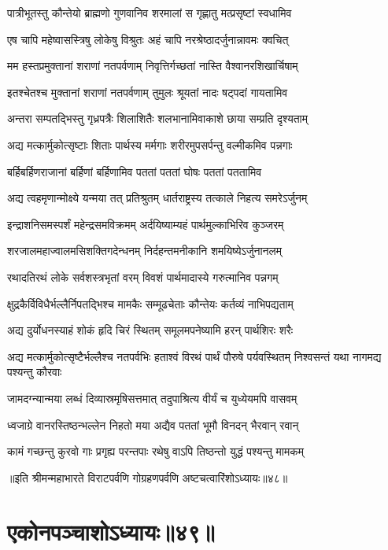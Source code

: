 \twolineshloka
{पात्रीभूतस्तु कौन्तेयो ब्राह्मणो गुणवानिव}
{शरमालां स गृह्णातु मत्प्रसृष्टां स्वधामिव}


\twolineshloka
{एष चापि महेष्वासस्त्रिषु लोकेषु विश्रुतः}
{अहं चापि नरश्रेष्ठादर्जुनान्नावमः क्वचित्}


\twolineshloka
{मम हस्तप्रमुक्तानां शराणां नतपर्वणाम्}
{निवृत्तिर्गच्छतां नास्ति वैश्वानरशिखार्चिषाम्}


\twolineshloka
{इतश्चेतश्च मुक्तानां शराणां नतपर्वणाम्}
{तुमुलः श्रूयतां नादः षट्पदां गायतामिव}


\twolineshloka
{अन्तरा सम्पतद्भिस्तु गृध्रपत्रैः शिलाशितैः}
{शलभानामिवाकाशे छाया सम्प्रति दृश्यताम्}


\twolineshloka
{अद्य मत्कार्मुकोत्सृष्टाः शिताः पार्थस्य मर्मगाः}
{शरीरमुपसर्पन्तु वल्मीकमिव पन्नगाः}


\twolineshloka
{बर्हिबर्हिणराजानां बर्हिणां बर्हिणामिव}
{पततां पततां घोषः पततां पततामिव}


\twolineshloka
{अद्य त्वहमृणान्मोक्ष्ये यन्मया तत् प्रतिश्रुतम्}
{धार्तराष्ट्रस्य तत्काले निहत्य समरेऽर्जुनम्}


\twolineshloka
{इन्द्राशनिसमस्पर्शं महेन्द्रसमविक्रमम्}
{अर्दयिष्याम्यहं पार्थमुल्काभिरिव कुञ्जरम्}


\twolineshloka
{शरजालमहाज्वालमसिशक्तिगदेन्धनम्}
{निर्दहन्तमनीकानि शमयिष्येऽर्जुनानलम्}


\twolineshloka
{रथादतिरथं लोके सर्वशस्त्रभृतां वरम्}
{विवशं पार्थमादास्ये गरुत्मानिव पन्नगम्}


\twolineshloka
{क्षुद्रकैर्विविधैर्भल्लैर्निपतद्भिश्च मामकैः}
{सम्मूढचेताः कौन्तेयः कर्तव्यं नाभिपद्यताम्}


\twolineshloka
{अद्य दुर्योधनस्याहं शोकं हृदि चिरं स्थितम्}
{समूलमपनेष्यामि हरन् पार्थशिरः शरैः}


\threelineshloka
{अद्य मत्कार्मुकोत्सृष्टैर्भल्लैश्च नतपर्वभिः}
{हताश्वं विरथं पार्थं पौरुषे पर्यवस्थितम्}
{निश्वसन्तं यथा नागमद्य पश्यन्तु कौरवाः}


\twolineshloka
{जामदग्न्यान्मया लब्धं दिव्यास्रमृषिसत्तमात्}
{तदुपाश्रित्य वीर्यं च युध्येयमपि वासवम्}


\twolineshloka
{ध्वजाग्रे वानरस्तिष्ठन्भल्लेन निहतो मया}
{अद्यैव पततां भूमौ विनदन् भैरवान् रवान्}


\twolineshloka
{कामं गच्छन्तु कुरवो गाः प्रगृह्य परन्तपाः}
{रथेषु वाऽपि तिष्ठन्तो युद्धं पश्यन्तु मामकम्}

॥इति श्रीमन्महाभारते विराटपर्वणि गोग्रहणपर्वणि अष्टचत्वारिंशोऽध्यायः॥४८॥

\chapter{एकोनपञ्चाशोऽध्यायः॥४९॥}

